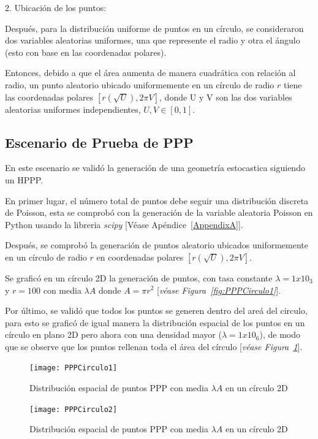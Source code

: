 2. Ubicación de los puntos:\newline

Después, para la distribución uniforme de puntos en un círculo, se consideraron dos variables aleatorias uniformes, una que represente el radio y otra el ángulo (esto con base en las coordenadas polares).\newline

Entonces, debido a que el área aumenta de manera cuadrática con relación al radio, un punto aleatorio ubicado uniformemente en un círculo de radio $r$ tiene las coordenadas polares $[r(\sqrt{U}), 2\pi V]$, donde U y V son las dos variables aleatorias uniformes independientes, $U, V \in{[0,1]}$.

\subsection{Escenario de Prueba de PPP}

En este escenario se validó la generación de una geometría estocastica siguiendo un HPPP.\newline

En primer lugar, el número total de puntos debe seguir una distribución discreta de Poisson, esta se comprobó con la generación de la variable aleatoria Poisson en Python usando la libreria \textit{scipy} [Véase Apéndice~\ref{AppendixA}].\newline

Después, se comprobó la generación de puntos aleatorio ubicados uniformemente en un círculo de radio $r$ en coordenadas polares $[r(\sqrt{U}), 2\pi V]$.\newline

Se graficó en un círculo 2D la generación de puntos, con tasa constante $\lambda = 1x10_3$ y $r = 100$ con media $\lambda A$ donde $A=\pi r^{2}$ [\textit{véase Figura~\ref{fig:PPPCirculo1}}].

Por último, se validó que todos los puntos se generen dentro del areá del circulo, para esto se graficó de igual manera la distribución espacial de los puntos en un círculo en plano 2D pero ahora con una densidad mayor ($\lambda = 1x10_6$), de modo que se observe que los puntos rellenan toda el área del círculo [\textit{véase Figura~\ref{fig:PPPCirculo2}}].

\begin{figure}
    \centering
    \begin{minipage}{.45\linewidth}
      \texttt{[image: PPPCirculo1]}
      \caption[Distribución espacial de puntos PPP en un círculo 2D]{Distribución espacial de puntos PPP con media $\lambda A$ en un círculo 2D}
      \label{fig:PPPCirculo1}
    \end{minipage}
    \hspace{.05\linewidth}
    \begin{minipage}{.45\linewidth}
      \texttt{[image: PPPCirculo2]}
      \caption[Distribución espacial de puntos PPP en un círculo 2D]{Distribución espacial de puntos PPP con media $\lambda A$ en un círculo 2D}
      \label{fig:PPPCirculo2}
    \end{minipage}
\end{figure}

